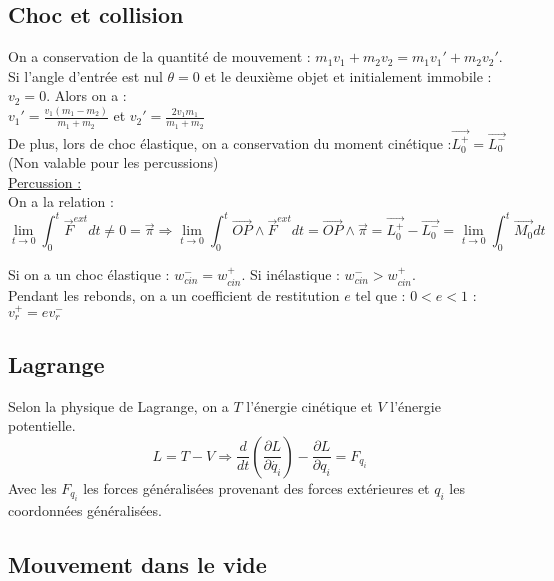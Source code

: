 \documentclass[../main.tex]{subfiles}
\begin{document}
\subsection{Choc et collision}
On a conservation de la quantité de mouvement : $m_1 v_1 + m_2 v_2 = m_1 v_1' + m_2 v_2'$.\\
Si l'angle d'entrée est nul $\theta =0$ et le deuxième objet et initialement immobile :$v_2 = 0$. Alors on a :\\
$v_1' = \frac{v_1 (m_1-m_2)}{m_1+m_2}$ et $v_2' = \frac{2v_1 m_1}{m_1+m_2}$\\
De plus, lors de choc élastique, on a conservation du moment cinétique :$\vec{L_0^+} = \vec{L_0^-}$ (Non valable pour les percussions)\\

\quad \underline{Percussion :}\\
On a la relation :\\
\begin{equation}
    \lim_{t\rightarrow 0} \int_0^t \vec{F}^{ext} dt \neq 0 = \vec{\pi} \Rightarrow \lim_{t\rightarrow0} \int_0^t \vec{OP} \wedge \vec{F}^{ext} dt = \vec{OP} \wedge \vec{\pi} = \vec{L_0^+}-\vec{L_0^-} = \lim_{t\rightarrow0} \int_0^t \vec{M_0}dt
\end{equation}


Si on a un choc élastique : $w_{cin}^- = w_{cin}^+$. Si inélastique : $w_{cin}^- > w_{cin}^+$. \\
Pendant les rebonds, on a un coefficient de restitution $e$ tel que : $0<e<1$ : $v_r^+ = ev_r^-$\\

\subsection{Lagrange}
Selon la physique de Lagrange, on a $T$ l'énergie cinétique et $V$ l'énergie potentielle.\\
\begin{equation}
    L = T-V \Rightarrow \frac{d}{dt}(\frac{\partial L}{\partial \dot{q_i}}) - \frac{\partial L}{\partial q_i} = F_{q_i}
\end{equation}
Avec les $F_{q_i}$ les forces généralisées provenant des forces extérieures et $q_i$ les coordonnées généralisées.\\

\subsection{Mouvement dans le vide}
\end{document}

